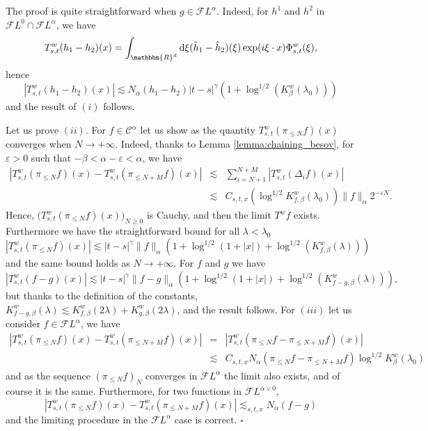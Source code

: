 \documentclass[a4paper,11pt]{article}
\newcommand{\mathd}{\mathrm{d}}
\newcommand{\noplus}{}
\newenvironment{proof}{{\sc Proof.}}{\hfill$\square$}
\newcommand{\CC}{\mathscr C}
\newcommand{\CF}{\mathscr F}
\begin{document}
\begin{proof}
  The proof is quite straightforward when $g \in \CF L^{\alpha}$. Indeed, for
  $h^{1}$ and $h^{2}$ in $\CF L^{0} \cap \CF L^{\alpha}$, we have
  \[ T_{s,t}^{w} ( h_{1} -h_{2} ) ( x ) = \int_{\mathbbm{R}^{d}} \mathd \xi (
     \hat{h}_{1} - \hat{h}_{2} ) ( \xi ) \exp ( i \xi \cdot x ) \Phi_{s,t}^{w} (
     \xi ), \]
  hence
  \[ | T^{w}_{s,t} ( h_{1} -h_{2} ) ( x ) | \lesssim N_{\alpha} ( h_{1}
     -h_{2} ) | t-s |^{\gamma} ( 1+ \log^{1/2} ( K^{w}_{\beta} ( \lambda_{0} )
     ) ) \]
  and the result of $( i )$ follows.
  
  
  
  Let us prove $( i i )$. For $f \in \CC^{\alpha}$ let us show as the quantity
  $T^{w}_{s,t} ( \pi_{\leqslant N} f ) ( x )$ converges when $N \rightarrow +
  \infty$. Indeed, thanks to Lemma \ref{lemma:chaining_besov}, for
  $\varepsilon >0$ such that $- \beta < \alpha - \varepsilon < \alpha$, we
  have
  \begin{eqnarray*}
    | T^{w}_{s,t} ( \pi_{\leqslant N} f ) ( x ) -T^{w}_{s,t} ( \pi_{\leqslant
    N+M} f ) ( x ) | & \lesssim & \sum_{i=N+1}^{N+M} | T^{w}_{s,t} (
    \Delta_{i} f ) ( x ) |\\
    & \lesssim & C_{s,t,x} ( \log^{1/2} K_{f, \beta}^{w} ( \lambda_{0} ) ) \|
    f \|_{\alpha} 2^{- \varepsilon N} .
  \end{eqnarray*}
  Hence, $\big( T^{w}_{s,t} ( \pi_{\leqslant N} f ) ( x ) \big)_{N\geqslant 0}$ is Cauchy,
  and then the limit $T^{w} f$ exists. Furthermore we have the straightforward
  bound for all $\lambda < \lambda_{0}$
  \[ | T^{w}_{s,t} ( \pi_{\leqslant N} f ) ( x ) | \lesssim | t-s |^{\gamma}
     \| f \|_{\alpha} ( 1+ \log^{1/2} ( 1+ | x | )   \noplus \noplus +
     \log^{1/2} ( K^{w}_{f, \beta} ( \lambda ) ) ) \]
  and the same bound holds as $N \rightarrow + \infty$.
  For $f$ and $g$ we have
  \[ | T^{w}_{s,t} ( f-g ) ( x ) | \lesssim | t-s |^{\gamma} \| f-g
     \|_{\alpha} ( 1+ \log^{1/2} ( 1+ | x | )    + \log^{1/2} (
     K^{w}_{f-g, \beta} ( \lambda ) ) ) , \]
  but thanks to the definition of the constants, $K^{w}_{f-g, \beta} ( \lambda
  ) \lesssim K^{w}_{f, \beta} ( 2 \lambda ) +K^{w}_{g, \beta} ( 2 \lambda )$,
  and the result follows.
  For $( i i i )$ let us consider $f \in \CF L^{\alpha}$, we have
  \begin{eqnarray*}
    | T^{w}_{s,t} ( \pi_{\leqslant N} f ) ( x ) -T^{w}_{s,t} ( \pi_{\leqslant
    N+M} f ) ( x ) | & = & | T^{w}_{s,t} ( \pi_{\leqslant N} f- \pi_{\leqslant
    N+M} f ) ( x ) |\\
    & \lesssim & C_{s,t,x} N_{\alpha} ( \pi_{\leqslant N} f- \pi_{\leqslant
    N+M} f )   \log^{1/2} K_{\beta}^{w} ( \lambda_{0} )
  \end{eqnarray*}
  and as the sequence $( \pi_{\leqslant N} f )_{N}$ converges in $\CF
  L^{\alpha}$ the limit also exists, and of course it is the same.
  Furthermore, for two functions in $\CF L^{\alpha \vee 0}$,
  \[ | T^{w}_{s,t} ( \pi_{\leqslant N} f ) ( x ) -T^{w}_{s,t} (
     \pi_{\leqslant N+M} f ) ( x ) | \lesssim_{s,t,x} N_{\alpha} ( f-g ) \]
  and the limiting procedure in the $\CF L^{\alpha}$ case is correct.
\end{proof}
\end{document}

